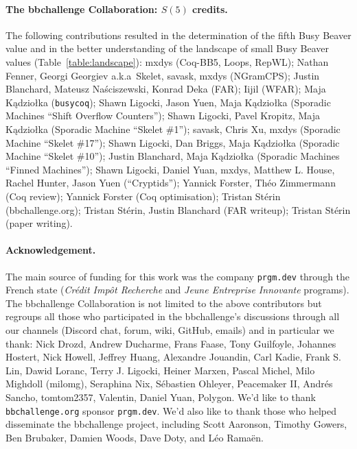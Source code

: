 \documentclass[sigconf,screen]{acmart}
\theoremstyle{definition} %
\numberwithin{equation}{section}
\theoremstyle{definition} %
\newcommand{\CoqBB}{Coq-BB5\xspace}
\begin{document}
\paragraph{The bbchallenge Collaboration: $S(5)$ credits.} The following contributions resulted in the determination of the fifth Busy Beaver value and in the better understanding of the landscape of small Busy Beaver values (Table~\ref{table:landscape}): mxdys (\CoqBB, Loops, RepWL); Nathan Fenner, Georgi Georgiev a.k.a~Skelet, savask, mxdys (NGramCPS); Justin Blanchard, Mateusz Na\'{s}ciszewski, Konrad Deka (FAR); Iijil (WFAR); Maja K\k{a}dzio{\l}ka (\texttt{busycoq}); Shawn Ligocki, Jason Yuen, Maja K\k{a}dzio{\l}ka (Sporadic Machines ``Shift Overflow Counters''); Shawn Ligocki, Pavel Kropitz, Maja K\k{a}dzio{\l}ka (Sporadic Machine ``Skelet \#1''); savask, Chris Xu, mxdys (Sporadic Machine ``Skelet \#17''); Shawn Ligocki, Dan Briggs, Maja K\k{a}dzio{\l}ka (Sporadic Machine ``Skelet \#10''); Justin Blanchard, Maja K\k{a}dzio{\l}ka (Sporadic Machines ``Finned Machines''); Shawn Ligocki, Daniel Yuan, mxdys, Matthew L. House, Rachel Hunter, Jason Yuen (``Cryptids''); Yannick Forster, Th\'eo Zimmermann (Coq review); Yannick Forster (Coq optimisation); Tristan St\'erin (bbchallenge.org); Tristan St\'erin, Justin Blanchard (FAR writeup); Tristan St\'erin (paper writing).

\paragraph{Acknowledgement.}  The main source of funding for this work was the company \texttt{prgm.dev} through the French state (\textit{Crédit Impôt Recherche} and \textit{Jeune Entreprise Innovante} programs). The bbchallenge Collaboration is not limited to the above contributors but regroups all those who participated in the bbchallenge's discussions through all our channels (Discord chat, forum, wiki, GitHub, emails) and in particular we thank:  Nick Drozd, Andrew Ducharme, Frans Faase, Tony Guilfoyle, Johannes Hostert, Nick Howell, Jeffrey Huang, Alexandre Jouandin, Carl Kadie, Frank S. Lin, Dawid Loranc, Terry J. Ligocki, Heiner Marxen, Pascal Michel, Milo Mighdoll (milomg), Seraphina Nix, S\'ebastien Ohleyer, Peacemaker II, Andr\'es Sancho, tomtom2357, Valentin, Daniel Yuan, Polygon. We'd like to thank \texttt{bbchallenge.org} sponsor \texttt{prgm.dev}. We'd also like to thank those who helped disseminate the bbchallenge project, including Scott Aaronson, Timothy Gowers, Ben Brubaker, Damien Woods, Dave Doty, and L\'eo Rama\"en. 
\end{document}

